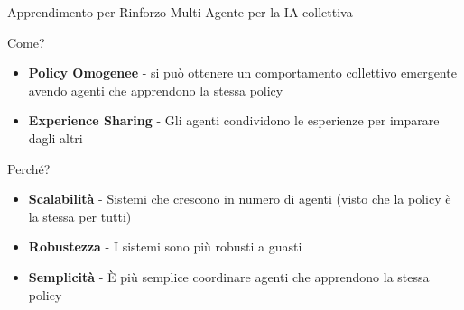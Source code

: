 \documentclass[presentation, 10pt,aspectratio=169]{beamer}\mode<presentation>{\usetheme{AMSBolognaFC}}
\begin{document}
\begin{frame}{Apprendimento per Rinforzo Multi-Agente per la IA collettiva}
	\begin{exampleblock}{Come?}
		\begin{itemize}
			\item \textbf{Policy Omogenee} - si può ottenere un comportamento collettivo emergente avendo agenti che apprendono la stessa policy 
			\item \textbf{Experience Sharing} - Gli agenti condividono le esperienze per imparare dagli altri
		\end{itemize}
	\end{exampleblock}
	\begin{alertblock}{Perché?}
		\begin{itemize}
			\item \textbf{Scalabilità} - Sistemi che crescono in numero di agenti (visto che la policy è la stessa per tutti)
			\item \textbf{Robustezza} - I sistemi sono più robusti a guasti
			\item \textbf{Semplicità} - È più semplice coordinare agenti che apprendono la stessa policy
		\end{itemize}
	\end{alertblock}
\end{frame}
\end{document}

